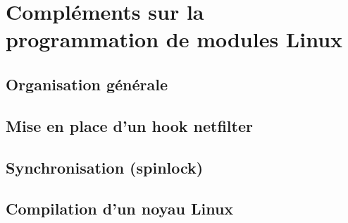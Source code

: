 \documentclass[a4paper]{article}
\begin{document}
\newpage
\appendix

\section{Compléments sur la programmation de modules Linux}
\subsection{Organisation générale}
\subsection{Mise en place d'un hook netfilter}
\subsection{Synchronisation (spinlock)}
\subsection{Compilation d'un noyau Linux}
\end{document}
